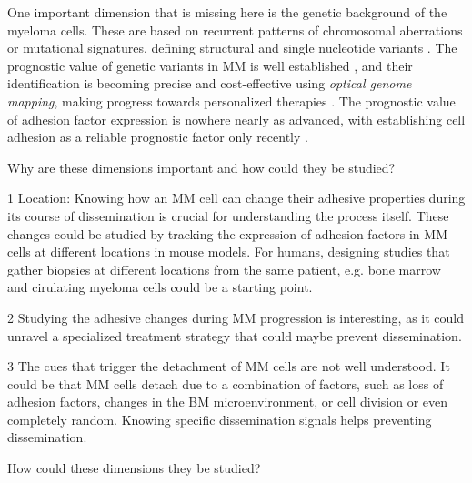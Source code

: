 One important dimension that is missing here is the genetic background of the
myeloma cells. These are based on recurrent patterns of chromosomal aberrations
or mutational signatures, defining structural and single nucleotide variants
\cite{kumarMultipleMyelomasCurrent2018a,
      hoangMutationalProcessesContributing2019}. The prognostic value of genetic
variants in MM is well established \cite{sharmaPrognosticRoleMYC2021}, and their
identification is becoming precise and cost-effective using \emph{optical
      genome mapping}, making progress towards personalized therapies
\cite{zouComprehensiveApproachEvaluate2024,
      budurleanIntegratingOpticalGenome2024}. The prognostic value of adhesion factor
expression is nowhere nearly as advanced, with establishing cell adhesion as a
reliable prognostic factor only recently
\cite{huDevelopmentCellAdhesionbased2024}.






Why are these dimensions important and how could they be studied?

1 Location: Knowing how an MM cell can change their adhesive properties during its course of
dissemination is crucial for understanding the process itself. These changes
could be studied by tracking the expression of adhesion factors in MM cells at
different locations in mouse models. For humans, designing studies that gather
biopsies at different locations from the same patient, e.g. bone marrow and cirulating
myeloma cells could be a starting point.

2 Studying the adhesive changes during MM progression is
interesting, as it could unravel a specialized treatment strategy
that could maybe prevent dissemination.

3 The cues that trigger the detachment of MM cells are not well understood. It
could be that MM cells detach due to a combination of factors, such as loss of
adhesion factors, changes in the BM microenvironment, or cell division or
even completely random. Knowing specific dissemination signals helps preventing
dissemination.


How could these dimensions they be studied?


